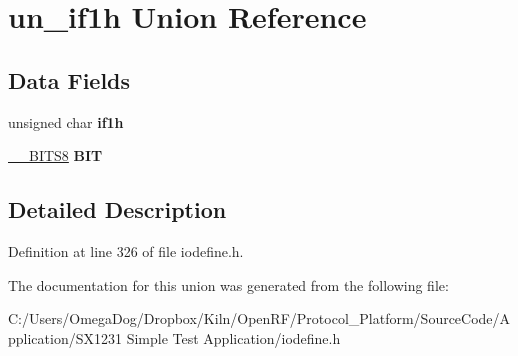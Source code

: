 \hypertarget{unionun__if1h}{\section{un\-\_\-if1h Union Reference}
\label{unionun__if1h}
}
\subsection*{Data Fields}
\begin{DoxyCompactItemize}
\item 
\hypertarget{unionun__if1h_a5d9105f7be8e64fbcf0f3621f2644980}{unsigned char {\bfseries if1h}}\label{unionun__if1h_a5d9105f7be8e64fbcf0f3621f2644980}

\item 
\hypertarget{unionun__if1h_a6f4cad433e7ccc39ad6d0b8d5093f423}{\hyperlink{struct_____b_i_t_s8}{\-\_\-\-\_\-\-B\-I\-T\-S8} {\bfseries B\-I\-T}}\label{unionun__if1h_a6f4cad433e7ccc39ad6d0b8d5093f423}

\end{DoxyCompactItemize}


\subsection{Detailed Description}


Definition at line 326 of file iodefine.\-h.



The documentation for this union was generated from the following file\-:\begin{DoxyCompactItemize}
\item 
C\-:/\-Users/\-Omega\-Dog/\-Dropbox/\-Kiln/\-Open\-R\-F/\-Protocol\-\_\-\-Platform/\-Source\-Code/\-Application/\-S\-X1231 Simple Test Application/iodefine.\-h\end{DoxyCompactItemize}
